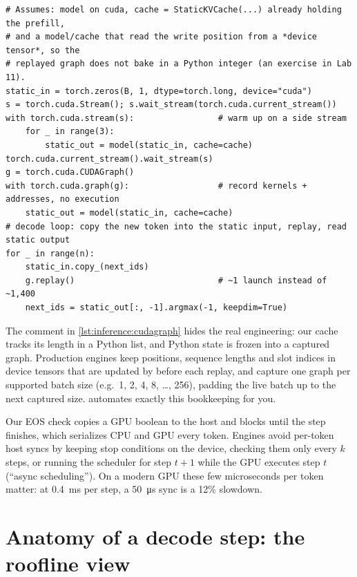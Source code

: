\begin{lstlisting}[caption={Capturing one static-cache decode step in a CUDA graph (GPU only).},label={lst:inference:cudagraph}]
# Assumes: model on cuda, cache = StaticKVCache(...) already holding the prefill,
# and a model/cache that read the write position from a *device tensor*, so the
# replayed graph does not bake in a Python integer (an exercise in Lab 11).
static_in = torch.zeros(B, 1, dtype=torch.long, device="cuda")
s = torch.cuda.Stream(); s.wait_stream(torch.cuda.current_stream())
with torch.cuda.stream(s):                 # warm up on a side stream
    for _ in range(3):
        static_out = model(static_in, cache=cache)
torch.cuda.current_stream().wait_stream(s)
g = torch.cuda.CUDAGraph()
with torch.cuda.graph(g):                  # record kernels + addresses, no execution
    static_out = model(static_in, cache=cache)
# decode loop: copy the new token into the static input, replay, read static output
for _ in range(n):
    static_in.copy_(next_ids)
    g.replay()                             # ~1 launch instead of ~1,400
    next_ids = static_out[:, -1].argmax(-1, keepdim=True)
\end{lstlisting}

The comment in \cref{lst:inference:cudagraph} hides the real engineering: our cache tracks its
length in a Python list, and Python state is frozen into a captured graph. Production engines keep
positions, sequence lengths and slot indices in device tensors that are updated by 
before each replay, and capture one graph per supported batch size (e.g.\ 1, 2, 4, 8, \ldots, 256),
padding the live batch up to the next captured size. 
automates exactly this bookkeeping for you.

\begin{systemslens}
Our EOS check  copies a GPU boolean to the host and blocks
until the step finishes, which serializes CPU and GPU every token. Engines avoid per-token host
syncs by keeping stop conditions on the device, checking them only every $k$ steps, or running
the scheduler for step $t+1$ while the GPU executes step $t$ (``async scheduling''). On a modern GPU
these few microseconds per token matter: at \SI{0.4}{ms} per step, a \SI{50}{\micro s} sync is a
12\% slowdown.
\end{systemslens}

\section{Anatomy of a decode step: the roofline view}\label{sec:inference:roofline}

